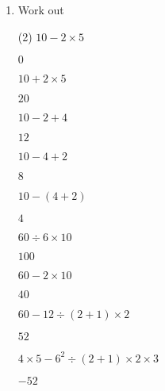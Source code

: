 \begin{enumerate} [leftmargin=0cm]
\item Work out
\begin{tasks}[label=(\alph*), after-item-skip=2pt,after-skip=3pt, label-width=4ex](2)
    \task  $ 10 -  2 \times 5                                    $                 \\  \begin{envAnswer}[blankline=3]        $    0    $ \end{envAnswer}
    \task  $ 10 +  2 \times 5                                    $                 \\  \begin{envAnswer}[blankline=3]        $   20    $ \end{envAnswer}
    \task  $ 10 - 2 +4                                           $                 \\  \begin{envAnswer}[blankline=3]        $   12    $ \end{envAnswer}
    \task  $ 10 - 4 + 2                                          $                 \\  \begin{envAnswer}[blankline=3]        $    8    $ \end{envAnswer}
    \task  $ 10 - (4 + 2)                                        $                 \\  \begin{envAnswer}[blankline=3]        $    4    $ \end{envAnswer}
    \task  $ 60 \div 6 \times 10                                 $                 \\  \begin{envAnswer}[blankline=3]        $  100    $ \end{envAnswer}
    \task  $ 60 -  2 \times 10                                   $                 \\  \begin{envAnswer}[blankline=3]        $   40    $ \end{envAnswer}
    \task  $ 60 -  12 \div  (2 +1) \times 2                      $                 \\  \begin{envAnswer}[blankline=5]        $   52    $ \end{envAnswer}    
    \task  $ 4 \times 5 -  6^2 \div  (2 +1) \times 2 \times 3    $                 \\  \begin{envAnswer}[blankline=5]        $  -52    $ \end{envAnswer}    
\end{tasks}


\end{enumerate}
